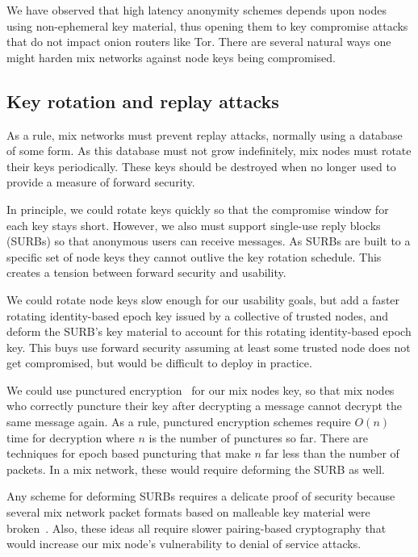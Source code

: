 \documentclass[twoside,letterpaper]{llncs}
\begin{document}
We have observed that high latency anonymity schemes depends upon
nodes using non-ephemeral key material, thus opening them to key
compromise attacks that do not impact onion routers like Tor.
There are several natural ways one might harden mix networks against
node keys being compromised. 

\subsection{Key rotation and replay attacks}

As a rule, mix networks must prevent replay attacks, normally using
a database of some form.  As this database must not grow indefinitely,
mix nodes must rotate their keys periodically.  These keys should be
destroyed when no longer used to provide a measure of forward security.

In principle, we could rotate keys quickly so that the compromise
window for each key stays short.  However, we also must
support single-use reply blocks (SURBs) so that anonymous users can
receive messages.  As SURBs are built to a specific set of node
keys they cannot outlive the key rotation schedule.  This creates
a tension between forward security and usability.

We could rotate node keys slow enough for our usability goals, but add
a faster rotating identity-based epoch key issued by a collective of
trusted nodes, and deform the SURB's key material to account for this
rotating identity-based epoch key.
This buys use forward security
assuming at least some trusted node does not get compromised, but
would be difficult to deploy in practice. 

We could use punctured encryption~\cite{libforwardsec} for our
mix nodes key, so that mix nodes who correctly puncture their key
after decrypting a message cannot decrypt the same message again. 
As a rule, punctured encryption schemes require $O(n)$ time for
decryption where $n$ is the number of punctures so far.  There are
techniques for epoch based puncturing that make $n$ far less than
the number of packets.  In a mix network, these would require
deforming the SURB as well. 

Any scheme for deforming SURBs requires a delicate proof of security
because several mix network packet formats based on malleable key
material were broken~\cite{Danezis2006}. 
Also, these ideas all require slower pairing-based cryptography that
would increase our mix node's vulnerability to denial of service attacks. 
\end{document}
